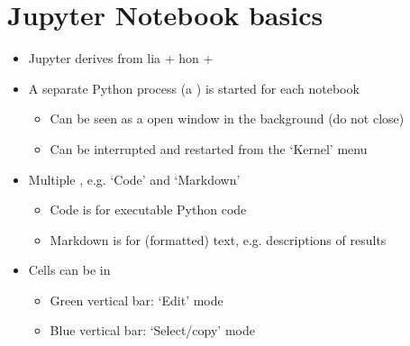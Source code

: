 \documentclass[letterpaper,10pt,english]{jupyterBook}
\begin{document}
\section{Jupyter Notebook basics}
\label{\detokenize{content/Python/Intro_Jupyter_notebook:jupyter-notebook-basics}}\begin{itemize}
\item {} 
\sphinxAtStartPar
Jupyter derives from lia + hon + 

\item {} 
\sphinxAtStartPar
A separate Python process (a ) is started for each notebook
\begin{itemize}
\item {} 
\sphinxAtStartPar
Can be seen as a open window in the background (do not close)

\item {} 
\sphinxAtStartPar
Can be interrupted and restarted from the ‘Kernel’ menu

\end{itemize}

\item {} 
\sphinxAtStartPar
Multiple , e.g. ‘Code’ and ‘Markdown’
\begin{itemize}
\item {} 
\sphinxAtStartPar
Code is for executable Python code

\item {} 
\sphinxAtStartPar
Markdown is for (formatted) text, e.g. descriptions of results

\end{itemize}

\item {} 
\sphinxAtStartPar
Cells can be in 
\begin{itemize}
\item {} 
\sphinxAtStartPar
Green vertical bar: ‘Edit’ mode

\item {} 
\sphinxAtStartPar
Blue vertical bar: ‘Select/copy’ mode

\end{itemize}

\end{itemize}
\end{document}

